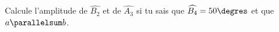 %
%
Calcule l'amplitude de $\widehat{B_2}$ et de $\widehat{A_3}$ si tu sais
    que $\widehat{B_4}=50\degres$ et que $a \parallelsum b$.
